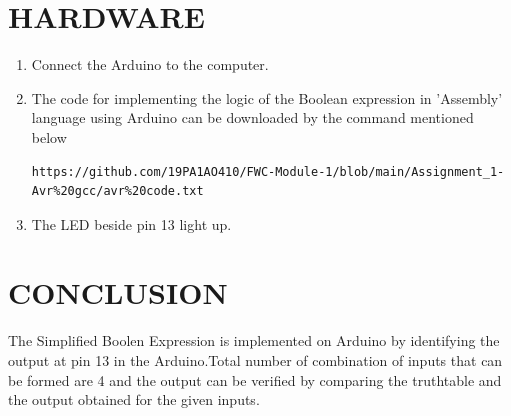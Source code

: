 \documentclass[10pt, a4paper]{article}
\begin{document}
\section{HARDWARE}
\begin{enumerate}
\item Connect the Arduino to the computer.
\item The code for implementing the logic of the Boolean expression in 'Assembly' language using Arduino can be downloaded by the command mentioned below\\
\begin{lstlisting}
https://github.com/19PA1AO410/FWC-Module-1/blob/main/Assignment_1-Avr%20gcc/avr%20code.txt
\end{lstlisting}
\item The LED beside pin 13 light up.
\end{enumerate}
\section{CONCLUSION}
The Simplified Boolen Expression is implemented on Arduino by identifying the output at pin 13 in the Arduino.Total number of combination of inputs that can be formed are 4 and the output can be verified by comparing the truthtable and the output obtained for the given inputs.


\end{document}
